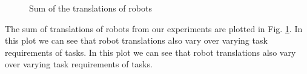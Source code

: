 \documentclass[final,5p,times,twocolumn]{elsarticle}
\begin{document}
\begin{figure}
\newline
{}
\newline
{}
\newline 
\caption{Sum of the translations of robots}
\label{fig:translation-stat}
\end{figure}
The sum of translations of robots from our experiments are plotted in Fig. \ref{fig:translation-stat}. In this plot we can see that robot translations also vary over varying task requirements of tasks. In this plot we can see that robot translations also vary over varying task requirements of tasks. 
\end{document}
